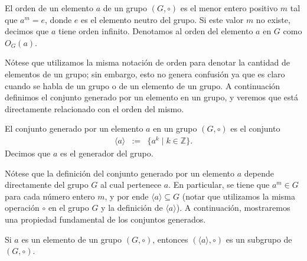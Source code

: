 \begin{definition}\label{def_orden}
	El orden de un elemento $a$ de un grupo $(G,\circ)$ es el menor entero positivo $m$ tal que $a^m = e$, donde
        $e$ es el elemento neutro del grupo. Si este valor $m$ no existe, decimos que $a$ tiene orden infinito. Denotamos al orden del elemento $a$ en $G$ como $O_G(a)$.
\end{definition} 
Nótese que utilizamos la misma notación de orden para denotar la cantidad de elementos de un grupo; sin embargo, esto no genera confusión ya que es claro cuando se habla de un grupo o de un elemento de un grupo. 
A continuación definimos el conjunto generado por un elemento en un grupo, y veremos que está directamente relacionado con el orden del mismo. 
 
\begin{definition}\label{def_gen}
	El conjunto generado por un elemento $a$ en un grupo $(G,\circ)$ es el conjunto
        \begin{eqnarray*}
        \langle a\rangle & := & \{a^k\mid k\in\mathbb{Z}\}.
        \end{eqnarray*}
        Decimos que $a$ es el generador del grupo.
\end{definition}

Nótese que la definición del conjunto generado por un elemento $a$
depende directamente del grupo $G$ al cual pertenece $a$. En
particular, se tiene que $a^m\in G$ para cada número entero $m$, y
por ende $\langle a\rangle\subseteq G$ (notar que utilizamos la misma
operación $\circ$ en el grupo $G$ y la definición de $\langle
a \rangle$). A continuación, mostraremos una propiedad fundamental de
los conjuntos generados.


\begin{proposition}\label{prop-generado}
	Si $a$ es un elemento de un grupo $(G,\circ)$, entonces $(\langle a\rangle ,\circ)$ es un subgrupo de $(G,\circ)$. 
\end{proposition} 


